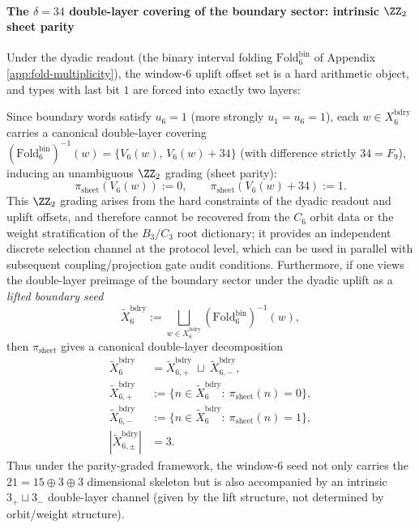 \paragraph{The \texorpdfstring{$\delta=34$}{delta=34} double-layer covering of the boundary sector: intrinsic \texorpdfstring{$\ZZ_2$}{Z2} sheet parity}
Under the dyadic readout (the binary interval folding \(\mathrm{Fold}^{\mathrm{bin}}_6\) of Appendix \ref{app:fold-multiplicity}),
the window-6 uplift offset set is a hard arithmetic object, and types with last bit \(1\) are forced into exactly two layers:

Since boundary words satisfy \(u_6=1\) (more strongly \(u_1=u_6=1\)), each \(w\in X_6^{\mathrm{bdry}}\) carries a canonical double-layer covering
\(
(\mathrm{Fold}^{\mathrm{bin}}_6)^{-1}(w)=\{V_6(w),\,V_6(w)+34\}
\)
(with difference strictly \(34=F_9\)), inducing an unambiguous \(\ZZ_2\) grading (sheet parity):
\[
\pi_{\mathrm{sheet}}(V_6(w)):=0,\qquad \pi_{\mathrm{sheet}}(V_6(w)+34):=1.
\]
This \(\ZZ_2\) grading arises from the hard constraints of the dyadic readout and uplift offsets, and therefore cannot be recovered from the \(C_6\) orbit data or the weight stratification of the \(B_3/C_3\) root dictionary; it provides an independent discrete selection channel at the protocol level, which can be used in parallel with subsequent coupling/projection gate audit conditions.
Furthermore, if one views the double-layer preimage of the boundary sector under the dyadic uplift as a \emph{lifted boundary seed}
\[
\widetilde X_6^{\mathrm{bdry}}
:=\bigsqcup_{w\in X_6^{\mathrm{bdry}}}(\mathrm{Fold}^{\mathrm{bin}}_6)^{-1}(w),
\]
then \(\pi_{\mathrm{sheet}}\) gives a canonical double-layer decomposition
\[
\begin{aligned}
\widetilde X_6^{\mathrm{bdry}}&=\widetilde X^{\mathrm{bdry}}_{6,+}\ \sqcup\ \widetilde X^{\mathrm{bdry}}_{6,-},\\
\widetilde X^{\mathrm{bdry}}_{6,+}&:=\{n\in\widetilde X_6^{\mathrm{bdry}}:\ \pi_{\mathrm{sheet}}(n)=0\},\\
\widetilde X^{\mathrm{bdry}}_{6,-}&:=\{n\in\widetilde X_6^{\mathrm{bdry}}:\ \pi_{\mathrm{sheet}}(n)=1\},\\
|\widetilde X^{\mathrm{bdry}}_{6,\pm}|&=3.
\end{aligned}
\]
Thus under the parity-graded framework, the window-6 seed not only carries the \(21=15\oplus 3\oplus 3\) dimensional skeleton but is also accompanied by an intrinsic \(3_+\sqcup 3_-\) double-layer channel (given by the lift structure, not determined by orbit/weight structure).
